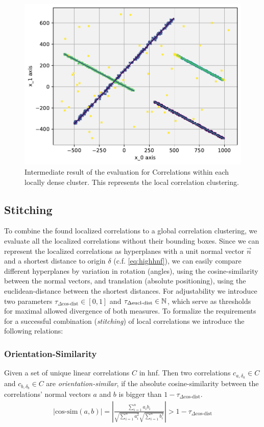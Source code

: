 \begin{figure}
    \centering
    \includegraphics[width=.7\textwidth]{figure_method_grid/LocalLinearCorrelationsWithColoredCorrs.pdf}
    \caption{Intermediate result of the evaluation for Correlations within each locally dense cluster. This represents the local correlation clustering.}
    \label{fig:local_lincorr}
\end{figure}

\subsection{Stitching}\label{ssec:stitching}

To combine the found localized correlations to a global correlation clustering, we evaluate all the localized correlations without their bounding boxes. Since we can represent the localized correlations as hyperplanes with a unit normal vector $\vec{n}$ and a shortest distance to origin $\delta$ (c.f. \autoref{eq:highhnf}), we can easily compare different hyperplanes by variation in rotation (angles), using the cosine-similarity between the normal vectors, and translation (absolute positioning), using the euclidean-distance between the shortest distances. For adjustability we introduce two parameters
$
\tau_{\Delta \text{cos-dist}} \in [0,1]$ 
and 
$
\tau_{\Delta \text{eucl-dist}} \in \mathbb{N}$, which serve as thresholds for maximal allowed divergence of both measures. To formalize the requirements for a successful combination (\textit{stitching}) of local correlations we introduce the following relations:

\subsubsection*{Orientation-Similarity}
Given a set of unique linear correlations $C$ in \gls{hnf}. Then two correlations $c_{a,\delta_a} \in C$ and $c_{b,\delta_b} \in C$ are \textit{orientation-similar}, if the absolute cosine-similarity between the correlations' normal vectors $a$ and $b$ is bigger than $1 - \tau_{\Delta \text{cos-dist}}$.
\begin{align}\label{eq:cosdist}
    |\text{cos-sim}(a,b)| = \left|\frac{\sum_{i=1}^{n} a_{i} b_{i}}{\sqrt{\sum_{i=1}^{n} a_{i}^{2}} \sqrt{\sum_{i=1}^{n} b_{i}^{2}}}\right| > 1 - \tau_{\Delta \text{cos-dist}}
\end{align}

